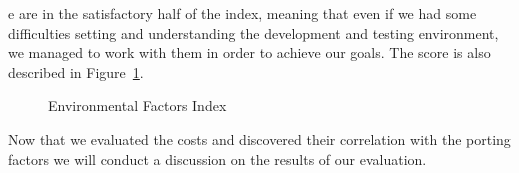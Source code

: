 e are in the satisfactory half of the index,
meaning that even if we had some difficulties setting and understanding the
development and testing environment, we managed to work with them in order to
achieve our goals. The score is also described in Figure~\ref{fig:efi}.

\begin{figure}[H]
    \begin{center}
    \end{center}

    \caption{Environmental Factors Index}
    \label{fig:efi}
\end{figure}

Now that we evaluated the costs and discovered their correlation with the porting
factors we will conduct a discussion on the results of our evaluation.
